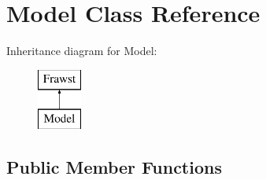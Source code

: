 \hypertarget{classModel}{
\section{Model Class Reference}
\label{classModel}
}
Inheritance diagram for Model:\begin{figure}[H]
\begin{center}
\leavevmode
\includegraphics[height=2.000000cm]{classModel}
\end{center}
\end{figure}
\subsection*{Public Member Functions}
